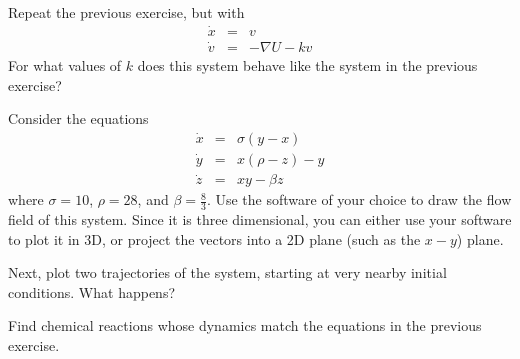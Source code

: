 \begin{exercise}
%
Repeat the previous exercise, but with
\begin{eqnarray*}
\dot x & = & v \\
\dot v & = & -\nabla U - k v
\end{eqnarray*}
For what values of $k$ does this system behave like the system in the
previous exercise?
%
\end{exercise}

\begin{exercise}
%
Consider the equations
\begin{eqnarray*}
\dot x & = & \sigma(y-x) \\
\dot y & = & x(\rho-z)-y \\
\dot z & = & x y - \beta z
\end{eqnarray*}
where $\sigma = 10$, $\rho = 28$, and $\beta = \frac{8}{3}$. Use the
software of your choice to draw the flow field of this system. Since
it is three dimensional, you can either use your software to plot it
in 3D, or project the vectors into a 2D plane (such as the $x-y$)
plane. 

Next, plot two trajectories of the system, starting at very nearby
initial conditions. What happens?
%
\end{exercise}

\begin{exercise}
%
Find chemical reactions whose dynamics match the equations in the
previous exercise.
%
\end{exercise}
